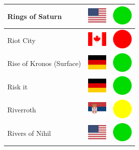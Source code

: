 \documentclass[12pt, a4paper, twoside]{report}
\begin{document}
\begin{center}
\begin{longtable}{|p{5cm}|p{2cm}|p{2cm}|}
 Rings of Saturn                                            & \includegraphics[width=1cm]{../4x3/us} &   \includegraphics[width=1cm]{../likes/y} \\ \hline
 Riot City                                                  & \includegraphics[width=1cm]{../4x3/ca} &   \includegraphics[width=1cm]{../likes/n} \\ \hline
 Rise of Kronos (Surface)                                   & \includegraphics[width=1cm]{../4x3/de} &   \includegraphics[width=1cm]{../likes/y} \\ \hline
 Risk it                                                    & \includegraphics[width=1cm]{../4x3/de} &   \includegraphics[width=1cm]{../likes/y} \\ \hline
 Riverroth                                                  & \includegraphics[width=1cm]{../4x3/rs} &   \includegraphics[width=1cm]{../likes/m} \\ \hline
 Rivers of Nihil                                            & \includegraphics[width=1cm]{../4x3/us} &   \includegraphics[width=1cm]{../likes/y} \\ \hline

\end{longtable}
\end{center}
\end{document}
